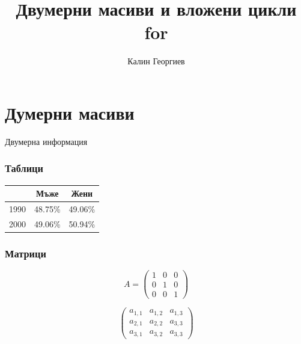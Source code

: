 \documentclass{beamer}
\begin{document}
\title[Увод в програмирането]{Двумерни масиви и вложени цикли for} 
\author{Калин Георгиев} 
\frame{\titlepage} 


\section{Думерни масиви} 


\begin{frame}
\centerline{Двумерна информация}
\end{frame}



\begin{frame}[fragile]
\frametitle{Таблици}


\begin{center}

\begin{tabular}{ c | c | c }
\hline
  & Мъже & Жени \\\hline
 1990 & 48.75\% & 49.06\% \\\hline
 2000 & 49.06\% & 50.94\% \\\hline
\end{tabular}

\end{center}

\end{frame}


\begin{frame}[fragile]
\frametitle{Матрици}


\begin{equation*}
A=\begin{pmatrix}
  1 & 0 & 0 \\
  0 & 1 & 0 \\
  0 & 0 & 1 
\end{pmatrix}
\end{equation*}

\pause

\begin{equation*}
\begin{pmatrix}
  a_{1,1} & a_{1,2} & a_{1,3} \\
  a_{2,1} & a_{2,2} & a_{3,3} \\
  a_{3,1} & a_{3,2} & a_{3,3} 
\end{pmatrix}
\end{equation*}


\end{frame}
\end{document}
